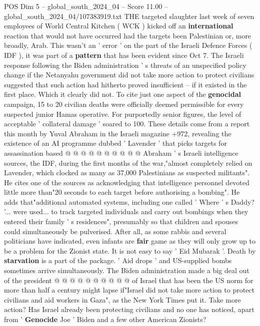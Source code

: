 \begin{textsample}{POS Dim 5 – global\_south\_2024\_04 – Score 11.00 – global\_south\_2024\_04/107383919.txt}  \label{ex:f5_pos_335}
THE targeted slaughter last week of seven employees of World Central Kitchen ( WCK ) kicked off an \textbf{international} reaction that would not have occurred had the targets been Palestinian or, more broadly, Arab.
This wasn't an ' error ' on the part of the Israeli Defence Forces ( IDF ), it was part of a \textbf{pattern} that has been evident since Oct 7.
The Israeli response following the Biden administration ' s threats of an unspecified policy change if the Netanyahu government did not take more action to protect civilians suggested that such action had hitherto proved insufficient -- if it existed in the first place.
Which it clearly did not.
To cite just one aspect of the \textbf{genocidal} campaign, 15 to 20 civilian deaths were officially deemed permissible for every suspected junior Hamas operative.
For purportedly senior figures, the level of acceptable ' collateral damage ' soared to 100.
These details come from a report this month by Yuval Abraham in the Israeli magazine +972, revealing the existence of an AI programme dubbed ' Lavender ' that picks targets for assassination based @ @ @ @ @ @ @ @ @ @ Abraham ' s Israeli intelligence sources, the IDF, during the first months of the war,"almost completely relied on Lavender, which clocked as many as 37,000 Palestinians as suspected militants".
He cites one of the sources as acknowledging that intelligence personnel devoted little more than"20 seconds to each target before authorising a bombing".
He adds that"additional automated systems, including one called ' Where ' s Daddy? '... were used... to track targeted individuals and carry out bombings when they entered their family ' s residences", presumably so that children and spouses could simultaneously be pulverised.
After all, as some rabbis and several politicians have indicated, even infants are \textbf{fair} game as they will only grow up to be a problem for the Zionist state.
It is not easy to say ' Eid Mubarak '.
Death by \textbf{starvation} is a part of the package. ' Aid drops ' and US-supplied bombs sometimes arrive simultaneously.
The Biden administration made a big deal out of the president @ @ @ @ @ @ @ @ @ @ of Israel that has been the US norm for more than half a century might lapse if"Israel did not take more action to protect civilians and aid workers in Gaza", as the New York Times put it.
Take more action?
Has Israel already been protecting civilians and no one has noticed, apart from ' \textbf{Genocide} Joe ' Biden and a few other American Zionists?

\end{textsample}
